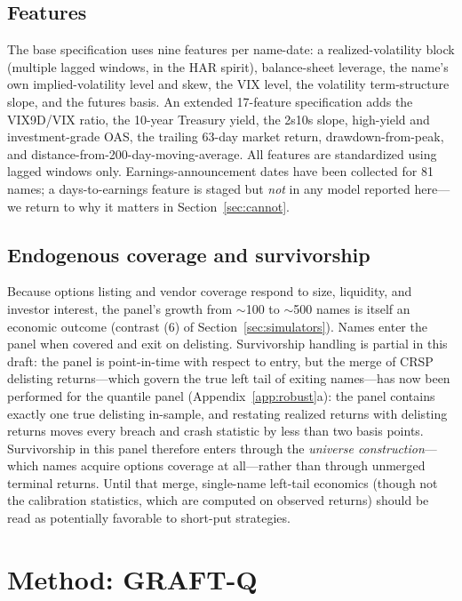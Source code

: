 \documentclass[11pt]{article}
\begin{document}
\subsection{Features}
The base specification uses nine features per name-date: a realized-volatility block (multiple lagged windows, in the HAR spirit), balance-sheet leverage, the name's own implied-volatility level and skew, the VIX level, the volatility term-structure slope, and the futures basis. An extended 17-feature specification adds the VIX9D/VIX ratio, the 10-year Treasury yield, the 2s10s slope, high-yield and investment-grade OAS, the trailing 63-day market return, drawdown-from-peak, and distance-from-200-day-moving-average. All features are standardized using lagged windows only. Earnings-announcement dates have been collected for 81 names; a days-to-earnings feature is staged but \emph{not} in any model reported here---we return to why it matters in Section~\ref{sec:cannot}.

\subsection{Endogenous coverage and survivorship}\label{sec:coverage}
Because options listing and vendor coverage respond to size, liquidity, and investor interest, the panel's growth from $\sim$100 to $\sim$500 names is itself an economic outcome (contrast (6) of Section~\ref{sec:simulators}). Names enter the panel when covered and exit on delisting. Survivorship handling is partial in this draft: the panel is point-in-time with respect to entry, but the merge of CRSP delisting returns---which govern the true left tail of exiting names---has now been performed for the quantile panel (Appendix~\ref{app:robust}a): the panel contains exactly one true delisting in-sample, and restating realized returns with delisting returns moves every breach and crash statistic by less than two basis points. Survivorship in this panel therefore enters through the \emph{universe construction}---which names acquire options coverage at all---rather than through unmerged terminal returns. Until that merge, single-name left-tail economics (though not the calibration statistics, which are computed on observed returns) should be read as potentially favorable to short-put strategies.

\section{Method: GRAFT-Q}\label{sec:method}
\end{document}

